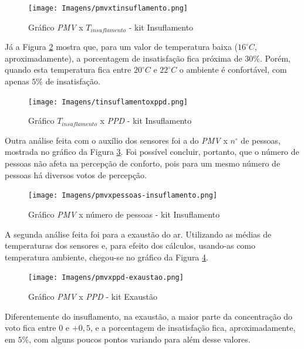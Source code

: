 \documentclass[acronym,symbols,table]{fei}
\begin{document}
\begin{figure}[!htb]
    \centering
    \caption{Gráfico \textit{PMV} x $T_{insuflamento}$ - kit Insuflamento}
    \texttt{[image: Imagens/pmvxtinsuflamento.png]}
    \label{fig:tinsuflamentoxpmv}
\end{figure}

Já a Figura \ref{fig:tinsuflamentoxppd} mostra que, para um valor de temperatura baixa ($16^\circ C$, aproximadamente), a porcentagem de insatisfação fica próxima de $30\%$. Porém, quando esta temperatura fica entre $20^\circ C$ e $22^\circ C$ o ambiente é confortável, com apenas $5\%$ de insatisfação.  

\begin{figure}[!htb]
    \centering
    \caption{Gráfico $T_{insuflamento}$ x \textit{PPD} - kit Insuflamento}
    \texttt{[image: Imagens/tinsuflamentoxppd.png]}
    \label{fig:tinsuflamentoxppd}
\end{figure}


Outra análise feita com o auxílio dos sensores foi a do \textit{PMV} x $n^\circ$ de pessoas, mostrada no gráfico da Figura \ref{fig:pmvxpessoas-insuflamento}. Foi possível concluir, portanto, que o número de pessoas não afeta na percepção de conforto, pois para um mesmo número de pessoas há diversos votos de percepção.

\begin{figure}[!htb]
    \centering
    \caption{Gráfico \textit{PMV} x número de pessoas - kit Insuflamento}
    \texttt{[image: Imagens/pmvxpessoas-insuflamento.png]}
    \label{fig:pmvxpessoas-insuflamento}
\end{figure}


A segunda análise feita foi para a exaustão do ar. Utilizando as médias de temperaturas dos sensores e, para efeito dos cálculos, usando-as como temperatura ambiente, chegou-se no gráfico da Figura \ref{fig:pmv-ppd-exaustao}.

\begin{figure}[!htb]
    \centering
    \caption{Gráfico \textit{PMV} x \textit{PPD} - kit Exaustão}
    \texttt{[image: Imagens/pmvxppd-exaustao.png]}
    \label{fig:pmv-ppd-exaustao}
\end{figure}

Diferentemente do insuflamento, na exaustão, a maior parte da concentração do voto fica entre $0$ e $+0,5$, e a porcentagem de insatisfação fica, aproximadamente, em $5\%$, com alguns poucos pontos variando para além desse valores.
\end{document}
